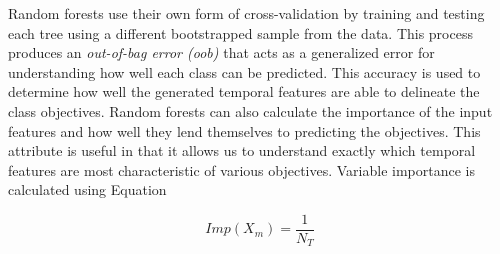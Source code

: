Random forests use their own form of cross-validation by training and testing each tree using a different bootstrapped sample from the data. This process produces an \emph{out-of-bag error (oob)} that acts as a generalized error for understanding how well each class can be predicted. This accuracy is used to determine how well the generated temporal features are able to delineate the class objectives. Random forests can also calculate the importance of the input features and how well they lend themselves to predicting the objectives. This attribute is useful in that it allows us to understand exactly which temporal features are most characteristic of various objectives. Variable importance is calculated using Equation

\begin{equation}
Imp(X_m) = \frac{1}{N_T}
\label{eq:mean}
\end{equation}

